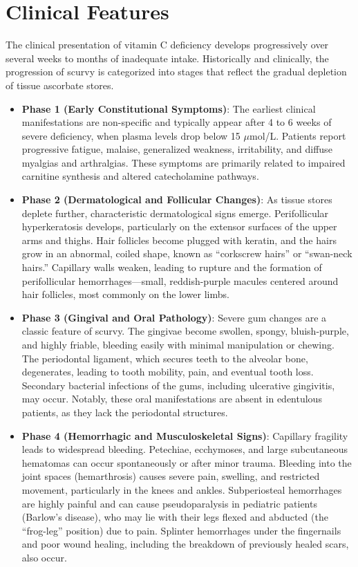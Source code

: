 \section*{Clinical Features}
The clinical presentation of vitamin C deficiency develops progressively over several weeks to months of inadequate intake. Historically and clinically, the progression of scurvy is categorized into stages that reflect the gradual depletion of tissue ascorbate stores.

\begin{itemize}
    \item \textbf{Phase 1 (Early Constitutional Symptoms)}: The earliest clinical manifestations are non-specific and typically appear after 4 to 6 weeks of severe deficiency, when plasma levels drop below 15 $\mu$mol/L. Patients report progressive fatigue, malaise, generalized weakness, irritability, and diffuse myalgias and arthralgias. These symptoms are primarily related to impaired carnitine synthesis and altered catecholamine pathways.
    \item \textbf{Phase 2 (Dermatological and Follicular Changes)}: As tissue stores deplete further, characteristic dermatological signs emerge. Perifollicular hyperkeratosis develops, particularly on the extensor surfaces of the upper arms and thighs. Hair follicles become plugged with keratin, and the hairs grow in an abnormal, coiled shape, known as ``corkscrew hairs'' or ``swan-neck hairs.'' Capillary walls weaken, leading to rupture and the formation of perifollicular hemorrhages—small, reddish-purple macules centered around hair follicles, most commonly on the lower limbs.
    \item \textbf{Phase 3 (Gingival and Oral Pathology)}: Severe gum changes are a classic feature of scurvy. The gingivae become swollen, spongy, bluish-purple, and highly friable, bleeding easily with minimal manipulation or chewing. The periodontal ligament, which secures teeth to the alveolar bone, degenerates, leading to tooth mobility, pain, and eventual tooth loss. Secondary bacterial infections of the gums, including ulcerative gingivitis, may occur. Notably, these oral manifestations are absent in edentulous patients, as they lack the periodontal structures.
    \item \textbf{Phase 4 (Hemorrhagic and Musculoskeletal Signs)}: Capillary fragility leads to widespread bleeding. Petechiae, ecchymoses, and large subcutaneous hematomas can occur spontaneously or after minor trauma. Bleeding into the joint spaces (hemarthrosis) causes severe pain, swelling, and restricted movement, particularly in the knees and ankles. Subperiosteal hemorrhages are highly painful and can cause pseudoparalysis in pediatric patients (Barlow's disease), who may lie with their legs flexed and abducted (the ``frog-leg'' position) due to pain. Splinter hemorrhages under the fingernails and poor wound healing, including the breakdown of previously healed scars, also occur.

\end{itemize}
